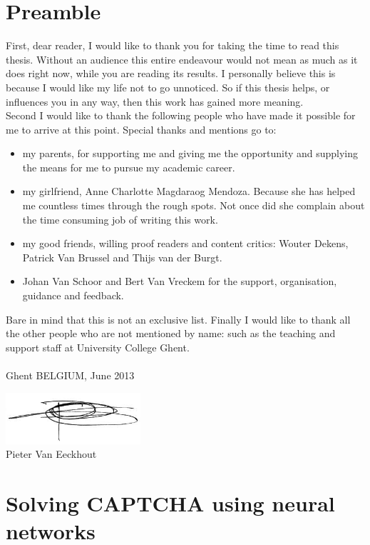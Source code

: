 \documentclass[pdftex,a4paper,12pt,twoside]{report}
\newcommand{\emptypage}{
\newpage
\thispagestyle{empty}
\mbox{}
\newpage
}
\theoremstyle{plain} \newtheorem{theorem}{Theorem} \newtheorem{proposition}{Proposition} \newtheorem{lemma}{Lemma} \newtheorem*{corollary}{Corollary}
\theoremstyle{definition} \newtheorem{definition}{Definition} \newtheorem{conjecture}{Conjecture} \newtheorem*{example}{Example} \newtheorem{algorithm}{Algorithm}
\theoremstyle{remark} \newtheorem*{remark}{Remark} \newtheorem*{note}{Note} \newtheorem{case}{Case}
\newcommand{\captchasp}{CAPTCHA }
\newcommand{\studenta}{Pieter {Van Eeckhout}}
\newcommand{\titel}{Solving \captchasp using neural networks}
\begin{document}
\emptypage

\chapter*{Preamble}
\label{ch:preamble}
First, dear reader, I would like to thank you for taking the time to read this thesis. Without an audience this entire endeavour would not mean as much as it does right now, while you are reading its results. I personally believe this is because I would like my life not to go unnoticed. So if this thesis helps, or influences you in any way, then this work has gained more meaning.\\Second I would like to thank the following people who have made it possible for me to arrive at this point. Special thanks and mentions go to:
\begin{itemize}
\item my parents, for supporting me and giving me the opportunity and supplying the means for me to pursue my academic career.
\item my girlfriend, Anne Charlotte Magdaraog Mendoza. Because she has helped me countless times through the rough spots. Not once did she complain about the time consuming job of writing this work.
\item my good friends, willing proof readers and content critics: Wouter Dekens, Patrick Van Brussel and Thijs van der Burgt.
\item Johan Van Schoor and Bert Van Vreckem for the support, organisation, guidance and feedback.
\end{itemize}
Bare in mind that this is not an exclusive list. Finally I would like to thank all the other people who are not mentioned by name: such as the teaching and support staff at University College Ghent.\\\\Ghent BELGIUM, June 2013
\begin{center}
\includegraphics[width=5cm]{./img/signature.png}\\[.5cm]
\studenta
\end{center}

\emptypage

\chapter{\titel}
\label{ch:introduction}
\end{document}
